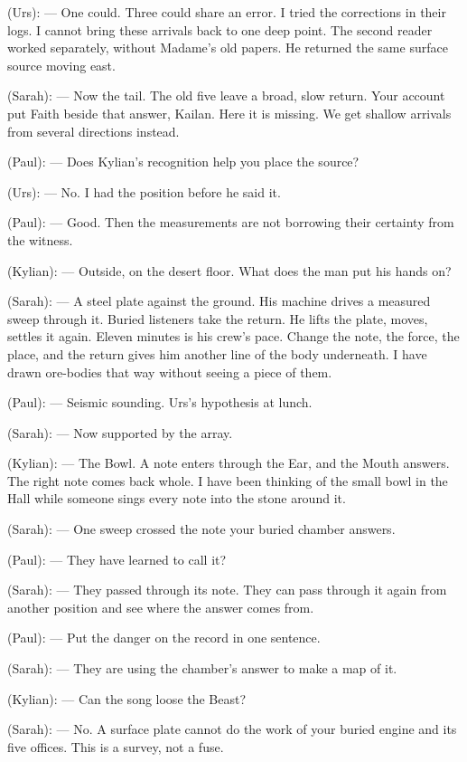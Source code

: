 \begin{room}
(Urs): --- One could. Three could share an error. I tried the corrections in their logs. I cannot bring these arrivals back to one deep point. The second reader worked separately, without Madame's old papers. He returned the same surface source moving east.

(Sarah): --- Now the tail. The old five leave a broad, slow return. Your account put Faith beside that answer, Kailan. Here it is missing. We get shallow arrivals from several directions instead.

(Paul): --- Does Kylian's recognition help you place the source?

(Urs): --- No. I had the position before he said it.

(Paul): --- Good. Then the measurements are not borrowing their certainty from the witness.

(Kylian): --- Outside, on the desert floor. What does the man put his hands on?

(Sarah): --- A steel plate against the ground. His machine drives a measured sweep through it. Buried listeners take the return. He lifts the plate, moves, settles it again. Eleven minutes is his crew's pace. Change the note, the force, the place, and the return gives him another line of the body underneath. I have drawn ore-bodies that way without seeing a piece of them.

(Paul): --- Seismic sounding. Urs's hypothesis at lunch.

(Sarah): --- Now supported by the array.

(Kylian): --- The Bowl. A note enters through the Ear, and the Mouth answers. The right note comes back whole. I have been thinking of the small bowl in the Hall while someone sings every note into the stone around it.

(Sarah): --- One sweep crossed the note your buried chamber answers.

(Paul): --- They have learned to call it?

(Sarah): --- They passed through its note. They can pass through it again from another position and see where the answer comes from.

(Paul): --- Put the danger on the record in one sentence.

(Sarah): --- They are using the chamber's answer to make a map of it.

(Kylian): --- Can the song loose the Beast?

(Sarah): --- No. A surface plate cannot do the work of your buried engine and its five offices. This is a survey, not a fuse.


\end{room}
